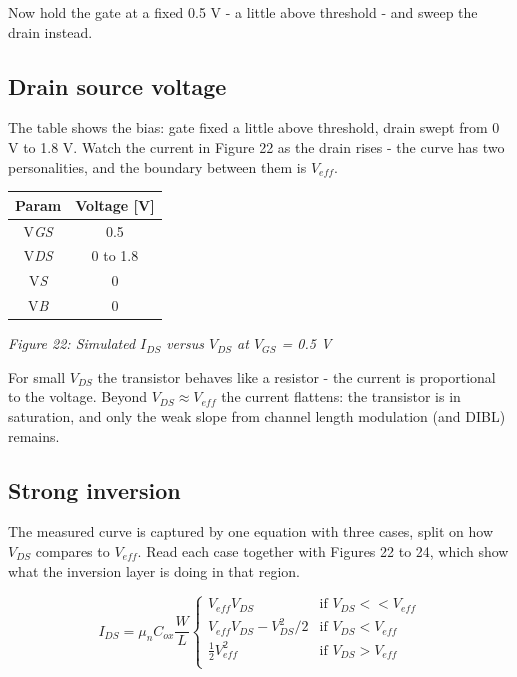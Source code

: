 Now hold the gate at a fixed 0.5 V - a little above threshold - and
sweep the drain instead.

\subsection{Drain source voltage}\label{drain-source-voltage}

The table shows the bias: gate fixed a little above threshold, drain
swept from 0 V to 1.8 V. Watch the current in Figure 22 as the drain
rises - the curve has two personalities, and the boundary between them
is \(V_{eff}\).

\begin{longtable}[]{@{}cc@{}}
\toprule\noalign{}
Param & Voltage {[}V{]} \\
\midrule\noalign{}
\endhead
\bottomrule\noalign{}
\endlastfoot
V\emph{GS} & 0.5 \\
V\emph{DS} & 0 to 1.8 \\
V\emph{S} & 0 \\
V\emph{B} & 0 \\
\end{longtable}


{
\centering
{}
}

\emph{Figure 22: Simulated \(I_{DS}\) versus \(V_{DS}\) at \(V_{GS}\) =
0.5 V}

For small \(V_{DS}\) the transistor behaves like a resistor - the
current is proportional to the voltage. Beyond
\(V_{DS} \approx V_{eff}\) the current flattens: the transistor is in
saturation, and only the weak slope from channel length modulation (and
DIBL) remains.

\subsection{Strong inversion}\label{strong-inversion}

The measured curve is captured by one equation with three cases, split
on how \(V_{DS}\) compares to \(V_{eff}\). Read each case together with
Figures 22 to 24, which show what the inversion layer is doing in that
region.

\[
I_{DS} = \mu_n C_{ox} \frac{W}{L} 
\begin{cases}
V_{eff} V_{DS} & \text{if }V_{DS} << V_{eff} \\[15pt]
V_{eff} V_{DS} - V_{DS}^2/2
& \text{if }  V_{DS} < V_{eff}  \\[15pt]
\frac{1}{2} V_{eff}^2
& \text{if }  V_{DS} > V_{eff} \\[15pt]
\end{cases}
\]


